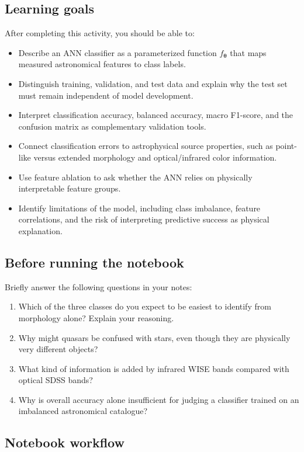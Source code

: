 \documentclass[11pt]{article}
\begin{document}
\subsection*{Learning goals}
After completing this activity, you should be able to:
\begin{itemize}
    \item Describe an ANN classifier as a parameterized function \(f_{\bm{\theta}}\) that maps measured astronomical features to class labels.
    \item Distinguish training, validation, and test data and explain why the test set must remain independent of model development.
    \item Interpret classification accuracy, balanced accuracy, macro F1-score, and the confusion matrix as complementary validation tools.
    \item Connect classification errors to astrophysical source properties, such as point-like versus extended morphology and optical/infrared color information.
    \item Use feature ablation to ask whether the ANN relies on physically interpretable feature groups.
    \item Identify limitations of the model, including class imbalance, feature correlations, and the risk of interpreting predictive success as physical explanation.
\end{itemize}

\subsection*{Before running the notebook}
Briefly answer the following questions in your notes:
\begin{enumerate}
    \item Which of the three classes do you expect to be easiest to identify from morphology alone? Explain your reasoning.
    \item Why might quasars be confused with stars, even though they are physically very different objects?
    \item What kind of information is added by infrared WISE bands compared with optical SDSS bands?
    \item Why is overall accuracy alone insufficient for judging a classifier trained on an imbalanced astronomical catalogue?
\end{enumerate}

\subsection*{Notebook workflow}
\end{document}
